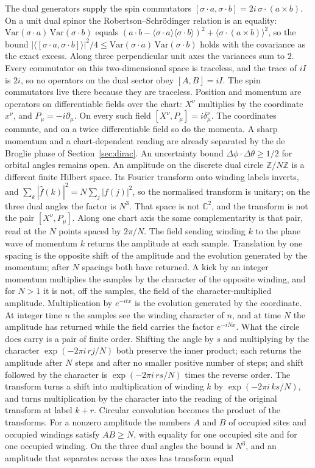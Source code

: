 \documentclass[a4paper]{article}
\begin{document}
The dual generators supply the spin commutators $[\sigma\cdot a,\sigma\cdot b]=2i\,\sigma\cdot(a\times b)$. On a unit dual spinor the Robertson--Schrödinger relation is an equality: $\mathrm{Var}(\sigma\cdot a)\,\mathrm{Var}(\sigma\cdot b)$ equals $(a\cdot b-\langle\sigma\cdot a\rangle\langle\sigma\cdot b\rangle)^2+\langle\sigma\cdot(a\times b)\rangle^2$, so the bound $|\langle[\sigma\cdot a,\sigma\cdot b]\rangle|^2/4\le\mathrm{Var}(\sigma\cdot a)\,\mathrm{Var}(\sigma\cdot b)$ holds with the covariance as the exact excess. Along three perpendicular unit axes the variances sum to $2$. Every commutator on this two-dimensional space is traceless, and the trace of $iI$ is $2i$, so no operators on the dual sector obey $[A,B]=iI$. The spin commutators live there because they are traceless. Position and momentum are operators on differentiable fields over the chart: $X^\nu$ multiplies by the coordinate $x^\nu$, and $P_\mu=-i\partial_\mu$. On every such field $[X^\nu,P_\mu]=i\delta^\nu_\mu$. The coordinates commute, and on a twice differentiable field so do the momenta. A sharp momentum and a chart-dependent reading are already separated by the de Broglie phase of Section~\ref{sec:dirac}. An uncertainty bound $\Delta\phi\cdot\Delta\theta\ge 1/2$ for orbital angles remains open. An amplitude on the discrete dual circle $\mathbb{Z}/N\mathbb{Z}$ is a different finite Hilbert space. Its Fourier transform onto winding labels inverts, and $\sum_k|\hat f(k)|^2=N\sum_j|f(j)|^2$, so the normalised transform is unitary; on the three dual angles the factor is $N^3$. That space is not $\mathbb{C}^2$, and the transform is not the pair $[X^\nu,P_\mu]$. Along one chart axis the same complementarity is that pair, read at the \(N\) points spaced by \(2\pi/N\). The field sending winding \(k\) to the plane wave of momentum \(k\) returns the amplitude at each sample. Translation by one spacing is the opposite shift of the amplitude and the evolution generated by the momentum; after \(N\) spacings both have returned. A kick by an integer momentum multiplies the samples by the character of the opposite winding, and for \(N>1\) it is not, off the samples, the field of the character-multiplied amplitude. Multiplication by \(e^{-itx}\) is the evolution generated by the coordinate. At integer time \(n\) the samples see the winding character of \(n\), and at time \(N\) the amplitude has returned while the field carries the factor \(e^{-iNx}\). What the circle does carry is a pair of finite order. Shifting the angle by $s$ and multiplying by the character $\exp(-2\pi i\, rj/N)$ both preserve the inner product; each returns the amplitude after $N$ steps and after no smaller positive number of steps; and shift followed by the character is $\exp(-2\pi i\, rs/N)$ times the reverse order. The transform turns a shift into multiplication of winding $k$ by $\exp(-2\pi i\, ks/N)$, and turns multiplication by the character into the reading of the original transform at label $k+r$. Circular convolution becomes the product of the transforms. For a nonzero amplitude the numbers $A$ and $B$ of occupied sites and occupied windings satisfy $AB\ge N$, with equality for one occupied site and for one occupied winding. On the three dual angles the bound is $N^3$, and an amplitude that separates across the axes has transform equal 
\end{document}
